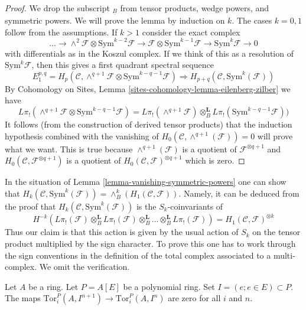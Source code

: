 \begin{proof}
We drop the subscript ${}_{\underline{B}}$ from tensor products, wedge powers,
and symmetric powers. We will prove the lemma by induction on $k$.
The cases $k = 0, 1$ follow from the assumptions. If $k > 1$ consider
the exact complex
$$
\ldots \to
\wedge^2\mathcal{F} \otimes \text{Sym}^{k - 2}\mathcal{F} \to
\mathcal{F} \otimes \text{Sym}^{k - 1}\mathcal{F} \to
\text{Sym}^k\mathcal{F} \to 0
$$
with differentials as in the Koszul complex. If we think of this as a
resolution of $\text{Sym}^k\mathcal{F}$, then this gives a first quadrant
spectral sequence
$$
E_1^{p, q} =
H_p(\mathcal{C},
\wedge^{q + 1}\mathcal{F} \otimes \text{Sym}^{k - q - 1}\mathcal{F})
\Rightarrow
H_{p + q}(\mathcal{C}, \text{Sym}^k(\mathcal{F}))
$$
By Cohomology on Sites, Lemma \ref{sites-cohomology-lemma-eilenberg-zilber}
we have
$$
L\pi_!(\wedge^{q + 1}\mathcal{F} \otimes \text{Sym}^{k - q - 1}\mathcal{F}) =
L\pi_!(\wedge^{q + 1}\mathcal{F}) \otimes_B^\mathbf{L}
L\pi_!(\text{Sym}^{k - q - 1}\mathcal{F}))
$$
It follows (from the construction of derived tensor products) that
the induction hypothesis combined with the vanishing
of $H_0(\mathcal{C}, \wedge^{q + 1}(\mathcal{F})) = 0$ will prove what we want.
This is true because $\wedge^{q + 1}(\mathcal{F})$ is a quotient
of $\mathcal{F}^{\otimes q + 1}$ and
$H_0(\mathcal{C}, \mathcal{F}^{\otimes q + 1})$
is a quotient of $H_0(\mathcal{C}, \mathcal{F})^{\otimes q + 1}$
which is zero.
\end{proof}

\begin{remark}
\label{remark-first-homology-symmetric-power}
In the situation of Lemma \ref{lemma-vanishing-symmetric-powers}
one can show that
$H_k(\mathcal{C}, \text{Sym}^k(\mathcal{F})) =
\wedge^k_B(H_1(\mathcal{C}, \mathcal{F}))$.
Namely, it can be deduced from the proof that
$H_k(\mathcal{C}, \text{Sym}^k(\mathcal{F}))$ is the $S_k$-coinvariants
of
$$
H^{-k}(L\pi_!(\mathcal{F}) \otimes_B^\mathbf{L}
L\pi_!(\mathcal{F}) \otimes_B^\mathbf{L}
\ldots \otimes_B^\mathbf{L} L\pi_!(\mathcal{F})) =
H_1(\mathcal{C}, \mathcal{F})^{\otimes k}
$$
Thus our claim is that this action is given by the usual action
of $S_k$ on the tensor product multiplied by the sign character.
To prove this one has to work through the sign conventions
in the definition of the total complex associated to a
multi-complex. We omit the verification.
\end{remark}

\begin{lemma}
\label{lemma-map-tors-zero}
Let $A$ be a ring. Let $P = A[E]$ be a polynomial ring.
Set $I = (e; e \in E) \subset P$. The maps
$\text{Tor}_i^P(A, I^{n + 1}) \to \text{Tor}_i^P(A, I^n)$
are zero for all $i$ and $n$.
\end{lemma}

